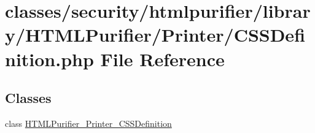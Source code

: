 \hypertarget{Printer_2CSSDefinition_8php}{\section{classes/security/htmlpurifier/library/\+H\+T\+M\+L\+Purifier/\+Printer/\+C\+S\+S\+Definition.php File Reference}
\label{Printer_2CSSDefinition_8php}
}
\subsection*{Classes}
\begin{DoxyCompactItemize}
\item 
class \hyperlink{classHTMLPurifier__Printer__CSSDefinition}{H\+T\+M\+L\+Purifier\+\_\+\+Printer\+\_\+\+C\+S\+S\+Definition}
\end{DoxyCompactItemize}
